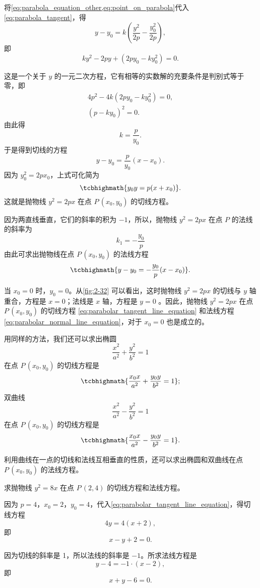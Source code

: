 将\cref{eq:parabola_equation_other,eq:point_on_parabola}代入\cref{eq:parabola_tangent}，得
\[y-y_0=k\left(\frac{y^2}{2p}-\frac{y_0^2}{2p}\right),\]
即
\[ ky^2-2py+(2py_0-ky_0^2)=0.\]

这是一个关于 $y$ 的一元二次方程，它有相等的实数解的充要条件是判别式等于零，即
\begin{gather*}
  4p^2-4k(2py_0-ky_0^2)=0,\\
  (p-ky_0)^2=0.
\end{gather*}
由此得
\[k=\frac{p}{y_0}.\]
于是得到切线的方程
\[y-y_0=\frac{p}{y_0}(x-x_0).\]
因为 $y_0^2=2px_0$，上式可化简为
\begin{equation}
  \label{eq:parabolar_tangent_line_equation}
  \tcbhighmath{y_0y=p(x+x_0)}.
\end{equation}
这就是抛物线 $y^2=2px$ 在点 $P\,(x_0,y_0)$ 的切线方程。

因为两直线垂直，它们的斜率的积为 $-1$，所以，抛物线 $y^2=2px$ 在点 $P$ 的法线的斜率为
\[k_1=-\frac{y_0}{p}\]
由此可求出抛物线在点 $P\,(x_0,y_0)$ 的法线方程
\begin{equation}
  \label{eq:parabolar_normal_line_equation}
\tcbhighmath{y-y_0=-\frac{y_0}{p}(x-x_0)}.
\end{equation}

当 $x_0=0$ 时，$y_0=0$。从\cref{fig:2-32} 可以看出，这时抛物线 $y^2=2px$ 的切线与 $y$ 轴重合，方程是 $x=0$；法线是 $x$ 轴，方程是 $y=0$ 。因此，抛物线 $y^2=2px$ 在点 $P\,(x_0,y_0)$ 的切线方程 \eqref{eq:parabolar_tangent_line_equation} 和法线方程 \eqref{eq:parabolar_normal_line_equation}，对于 $x_0=0$ 也是成立的。

用同样的方法，我们还可以求出椭圆
\[\frac{x^2}{a^2}+\frac{y^2}{b^2}=1\]
在点 $P\,(x_0,y_0)$ 的切线方程是
\[\tcbhighmath{\frac{x_0x}{a^2}+\frac{y_0y}{b^2}=1};\]
双曲线
\[\frac{x^2}{a^2}-\frac{y^2}{b^2}=1\]
在点 $P\,(x_0,y_0)$ 的切线方程是
\[\tcbhighmath{\frac{x_0x}{a^2}-\frac{y_0y}{b^2}=1}.\]

利用曲线在一点的切线和法线互相垂直的性质，还可以求出椭圆和双曲线在点 $P\,(x_0,y_0)$ 的法线方程。

\begin{example}
  求抛物线 $y^2=8x$ 在点 $P\,(2,4)$ 的切线方程和法线方程。
\end{example}
\begin{solution}
  因为 $p=4$，$x_0=2$，$y_0=4$，代入\cref{eq:parabolar_tangent_line_equation}，得切线方程
  \[4y=4(x+2),\]
  即
  \[x-y+2=0.\]

  因为切线的斜率是 1，所以法线的斜率是 $-1$。所求法线方程是
  \[y-4=-1\cdot(x-2), \]
  即
  \[x+y-6=0.\]
\end{solution}

